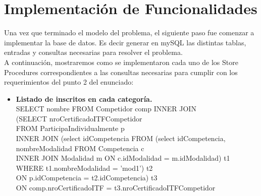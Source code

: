 \section{Implementación  de Funcionalidades}

Una vez que terminado el modelo del problema, el siguiente paso fue comenzar a implementar la base de datos. Es decir generar en mySQL las distintas tablas, entradas y consultas necesarias para resolver el problema.\\

A continuación, mostraremos como se implementaron cada uno de los Store Procedures correspondientes a las consultas necesarias para cumplir con los requerimientos del punto 2 del enunciado:\\

\begin{itemize}
\item{\textbf{Listado de inscritos en cada categoría.}\\
SELECT nombre FROM Competidor comp INNER JOIN \\
(SELECT nroCertificadoITFCompetidor \\
FROM ParticipaIndividualmente p \\
INNER JOIN (select idCompetencia FROM (select idCompetencia, nombreModalidad FROM Competencia c\\
INNER JOIN Modalidad m ON c.idModalidad = m.idModalidad) t1 WHERE t1.nombreModalidad = 'mod1') t2\\
ON p.idCompetencia = t2.idCompetencia) t3 \\
ON comp.nroCertificadoITF = t3.nroCertificadoITFCompetidor\;\\
}


\end{itemize}
